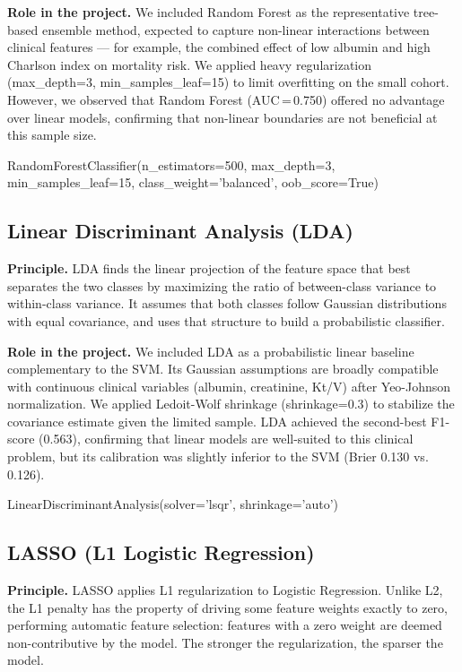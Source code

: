 \documentclass[12pt,a4paper,twoside]{report}
\newcommand{\config}[1]{%
  \vspace{6pt}%
  \noindent\begin{tcolorbox}[
    enhanced, breakable,
    colback=platbg,
    colframe=primary!50,
    boxrule=0.6pt,
    arc=5pt,
    left=10pt, right=8pt, top=4pt, bottom=5pt,
    toptitle=3pt, bottomtitle=3pt,
    fontupper=\ttfamily\footnotesize\color{navydark},
    title={\footnotesize\bfseries Configuration},
    coltitle=white,
    colbacktitle=primary,
    titlerule=0pt
  ]
  #1
  \end{tcolorbox}%
  \vspace{4pt}%
}
\begin{document}
\textbf{Role in the project.} We included Random Forest as the representative tree-based ensemble method, expected to capture non-linear interactions between clinical features — for example, the combined effect of low albumin and high Charlson index on mortality risk. We applied heavy regularization (max\_depth=3, min\_samples\_leaf=15) to limit overfitting on the small cohort. However, we observed that Random Forest (AUC\,=\,0.750) offered no advantage over linear models, confirming that non-linear boundaries are not beneficial at this sample size.

\config{RandomForestClassifier(n\_estimators=500, max\_depth=3, min\_samples\_leaf=15, class\_weight='balanced', oob\_score=True)}

\subsection{Linear Discriminant Analysis (LDA)}

\textbf{Principle.} LDA finds the linear projection of the feature space that best separates the two classes by maximizing the ratio of between-class variance to within-class variance. It assumes that both classes follow Gaussian distributions with equal covariance, and uses that structure to build a probabilistic classifier.

\textbf{Role in the project.} We included LDA as a probabilistic linear baseline complementary to the SVM. Its Gaussian assumptions are broadly compatible with continuous clinical variables (albumin, creatinine, Kt/V) after Yeo-Johnson normalization. We applied Ledoit-Wolf shrinkage (shrinkage=0.3) to stabilize the covariance estimate given the limited sample. LDA achieved the second-best F1-score (0.563), confirming that linear models are well-suited to this clinical problem, but its calibration was slightly inferior to the SVM (Brier 0.130 vs. 0.126).

\config{LinearDiscriminantAnalysis(solver='lsqr', shrinkage='auto')}

\subsection{LASSO (L1 Logistic Regression)}

\textbf{Principle.} LASSO applies L1 regularization to Logistic Regression. Unlike L2, the L1 penalty has the property of driving some feature weights exactly to zero, performing automatic feature selection: features with a zero weight are deemed non-contributive by the model. The stronger the regularization, the sparser the model.
\end{document}
